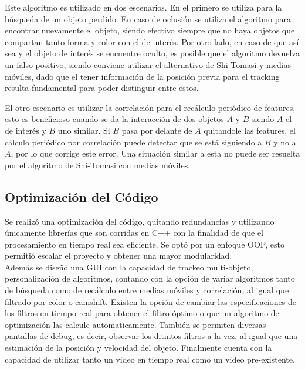 Este algoritmo es utilizado en dos escenarios. En el primero se utiliza para la búsqueda de un objeto perdido. En caso de oclusión se utiliza el algoritmo para encontrar nuevamente el objeto, siendo efectivo siempre que no haya objetos que compartan tanto forma y color con el de interés. Por otro lado, en caso de que así sea y el objeto de interés se encuentre oculto, es posible que el algoritmo devuelva un falso positivo, siendo conviene utilizar el alternativo de Shi-Tomasi y medias móviles, dado que el tener información de la posición previa para el tracking resulta fundamental para poder distinguir entre estos.

El otro escenario es utilizar la correlación para el recálculo periódico de features, esto es beneficioso cuando se da la interacción de dos objetos $A$ y $B$ siendo $A$ el de interés y $B$ uno similar. Si $B$ pasa por delante de $A$ quitandole las features, el cálculo periódico por correlación puede detectar que se está siguiendo a $B$ y no a $A$, por lo que corrige este error. Una situación similar a esta no puede ser resuelta por el algoritmo de Shi-Tomasi con medias móviles.


\subsection{Optimización del Código}
Se realizó una optimización del código, quitando redundancias y utilizando únicamente librerías que son corridas en C++ con la finalidad de que el procesamiento en tiempo real sea eficiente. Se optó por un enfoque OOP, esto permitió escalar el proyecto y obtener una mayor modularidad. \\
Además se diseñó una GUI con la capacidad de trackeo multi-objeto, personalización de algoritmos, contando con la opción de variar algoritmos tanto de búsqueda como de recálculo entre medias móviles y correlación, al igual que filtrado por color o camshift. Existen la opción de cambiar las especificaciones de los filtros en tiempo real para obtener el filtro óptimo o que un algoritmo de optimización las calcule automaticamente. También se permiten diversas pantallas de debug, es decir, observar los ditintos filtros a la vez, al igual que una estimación de la posición y velocidad del objeto. Finalmente cuenta con la capacidad de utilizar tanto un video en tiempo real como un video pre-existente.






